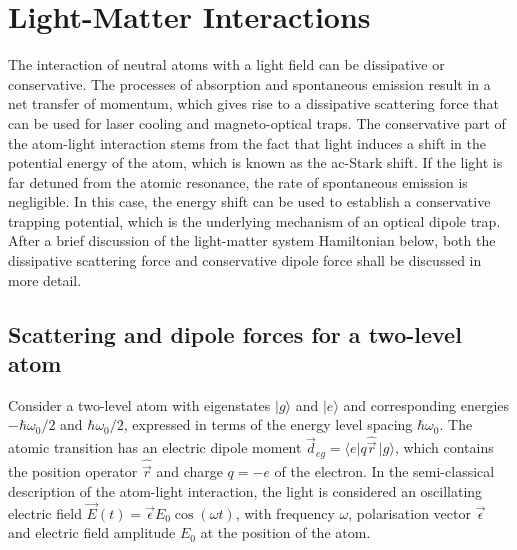 \documentclass[../Thesis-IJspeert.tex]{subfiles}
\begin{document}
\graphicspath{ {"Light Matter Interactions/figs/"} }

\chapter{Light-Matter Interactions}
\label{chap:LightMatterInteractions}

The interaction of neutral atoms with a light field can be dissipative or conservative. The processes of absorption and spontaneous emission result in a net transfer of momentum, which gives rise to a dissipative scattering force that can be used for laser cooling and magneto-optical traps. The conservative part of the atom-light interaction stems from the fact that light induces a shift in the potential energy of the atom, which is known as the ac-Stark shift. If the light is far detuned from the atomic resonance, the rate of spontaneous emission is negligible. In this case, the energy shift can be used to establish a conservative trapping potential, which is the underlying mechanism of an optical dipole trap. After a brief discussion of the light-matter system Hamiltonian below, both the dissipative scattering force and conservative dipole force shall be discussed in more detail.

\section{Scattering and dipole forces for a two-level atom}
\label{subsection_System_Hamiltonian}
Consider a two-level atom with eigenstates $\vert g \rangle$ and $\vert e \rangle$ and corresponding energies $-\hbar\omega_0/2$ and $\hbar\omega_0/2$, expressed in terms of the energy level spacing $\hbar\omega_0$. The atomic transition has an electric dipole moment $\vec{d}_{eg}=\langle e \vert q \hat{\vec{r}} \,\vert g \rangle$, which contains the position operator $\hat{\vec{r}}$ and charge $q=-e$ of the electron. In the semi-classical description of the atom-light interaction, the light is considered an oscillating electric field $\vec{E}(t)=\vec{\epsilon}E_0\cos \left(\omega t\right)$, with frequency $\omega$, polarisation vector $\vec{\epsilon}$ and electric field amplitude $E_0$ at the position of the atom.
\end{document}
